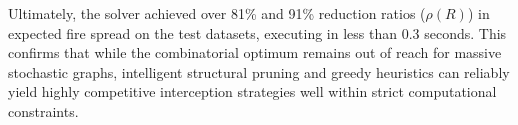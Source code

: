 \documentclass[11pt]{article}
\begin{document}
Ultimately, the solver achieved over 81\% and 91\% reduction ratios ($\rho(R)$) in expected fire spread on the test datasets, executing in less than 0.3 seconds. This confirms that while the combinatorial optimum remains out of reach for massive stochastic graphs, intelligent structural pruning and greedy heuristics can reliably yield highly competitive interception strategies well within strict computational constraints.
\end{document}
